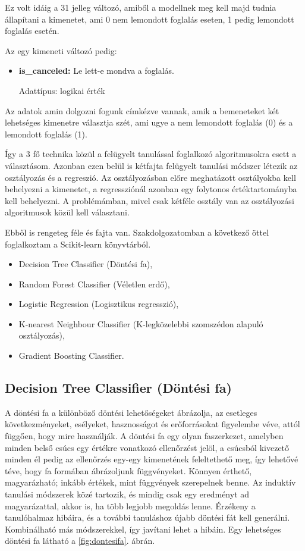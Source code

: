 Ez volt idáig a 31 jelleg változó, amiből a modellnek meg kell majd tudnia állapítani a kimenetet, ami 0 nem lemondott foglalás eseten, 1 pedig lemondott foglalás esetén.

Az egy kimeneti változó pedig:
\begin{itemize}
    \item \textbf{is\_canceled:} Le lett-e mondva a foglalás. 
    
    Adattípus: logikai érték
\end{itemize}

Az adatok amin dolgozni fogunk címkézve vannak, amik a bemeneteket két lehetséges kimenetre választja szét, ami ugye a nem lemondott foglalás (0) és a lemondott foglalás (1).

Így a 3 fő technika közül a felügyelt tanulással foglalkozó algoritmusokra esett a választásom. Azonban ezen belül is kétfajta felügyelt tanulási módszer létezik az osztályozás és a regreszió. Az osztályozásban előre meghatázott osztályokba kell behelyezni a kimenetet, a regressziónál azonban egy folytonos értéktartományba kell behelyezni. A problémámban, mivel csak kétféle osztály van az osztályozási algoritmusok közül kell választani.

Ebből is rengeteg féle és fajta van. Szakdolgozatomban a következő öttel foglalkoztam a Scikit-learn könyvtárból.

\begin{itemize}
    \item Decision Tree Classifier (Döntési fa),
    \item Random Forest Classifier (Véletlen erdő),
    \item Logistic Regression (Logisztikus regresszió),
    \item K-nearest Neighbour Classifier (K-legközelebbi szomszédon alapuló osztályozás),
    \item Gradient Boosting Classifier.
\end{itemize}

\subsection{Decision Tree Classifier (Döntési fa)}
A döntési fa a különböző döntési lehetőségeket ábrázolja, az esetleges következményeket, esélyeket, hasznosságot és erőforrásokat figyelembe véve, attól függően, hogy mire használják. A döntési fa egy olyan faszerkezet, amelyben minden belső csúcs egy értékre vonatkozó ellenőrzést jelöl, a csúcsból kivezető minden él pedig az ellenőrzés egy-egy kimenetének feleltethető meg, így lehetővé téve, hogy fa formában ábrázoljunk függvényeket. Könnyen érthető, magyarázható; inkább értékek, mint függvények szerepelnek benne. Az induktív tanulási módszerek közé tartozik, és mindig csak egy eredményt ad magyarázattal, akkor is, ha több legjobb megoldás lenne. Érzékeny a tanulóhalmaz hibáira, és a további tanuláshoz újabb döntési fát kell generálni. Kombinálható más módszerekkel, így javítani lehet a hibáin. Egy lehetséges döntési fa látható a \ref{fig:dontesifa}. ábrán.

